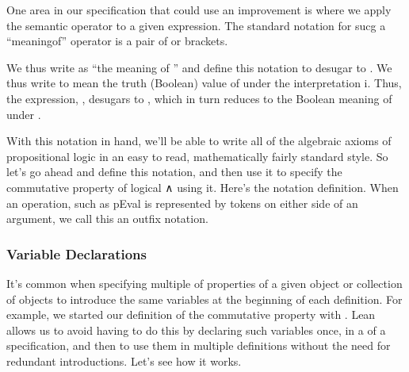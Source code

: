 \documentclass[letterpaper,10pt,english]{sphinxmanual}
\begin{document}
\sphinxAtStartPar
One area in our specification that could use an
improvement is where we apply the  semantic
 operator to a given expression. The
standard notation for sucg a “meaning\sphinxhyphen{}of” operator
is a pair of  or  brackets.

\sphinxAtStartPar
We thus write  as “the meaning of ” and
define this notation to desugar to . We
thus  write  to mean the truth (Boolean)
value of  under the interpretation i. Thus, the
expression, , desugars to  ,
which in turn reduces to the Boolean meaning of
 under .

\sphinxAtStartPar
With this notation in hand, we’ll be able to write
all of the algebraic axioms of propositional logic
in an easy to read, mathematically fairly standard
style. So let’s go ahead and define this notation,
and then use it to specify the commutative property
of logical ∧ using it.
Here’s the notation definition. When an operation,
such as pEval is represented by tokens on either side
of an argument, we call this an outfix notation.

\begin{sphinxVerbatim}[commandchars=\\\{\}]
               
\end{sphinxVerbatim}


\subsubsection{Variable Declarations}
\label{\detokenize{A_01_Propositional_Logic:variable-declarations}}
\sphinxAtStartPar
It’s common when specifying multiple of properties of a
given object or collection of objects to introduce the
same variables at the beginning of each definition. For
example, we started our definition of the commutative
property with .
Lean allows us to avoid having to do this by declaring
such variables once, in a  of a specification,
and then to use them in multiple definitions without
the need for redundant introductions. Let’s see how it
works.
\end{document}
